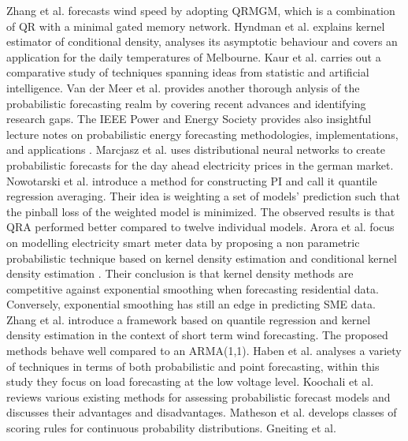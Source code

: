 Zhang et al. \cite{zhang2019wind} forecasts wind speed by adopting QRMGM, which is a combination of QR with a minimal gated memory network.
Hyndman et al. \cite{hyndman1996estimating} explains kernel estimator of conditional density, analyses its asymptotic behaviour and covers an application for the daily temperatures of Melbourne.
Kaur et al. \cite{kaur2022energy} carries out a comparative study of techniques spanning ideas from statistic and artificial intelligence.
Van der Meer et al. \cite{van2018review} provides another thorough anlysis of the probabilistic forecasting realm by covering recent advances and identifying research gaps.
The IEEE Power and Energy Society provides also insightful lecture notes on probabilistic energy forecasting methodologies,
implementations, and applications \cite{gm_22}.
Marcjasz et al. \cite{probablistic_electricity_forecast2} uses distributional neural networks to create probabilistic forecasts for the day ahead electricity prices in the german market.
Nowotarski et al. \cite{nowotarski2015computing} introduce a method for constructing PI and call it quantile regression averaging. Their idea is weighting a set of models' prediction such that the pinball loss of the weighted model is minimized. The observed results is that QRA performed better compared to twelve individual models.
Arora et al. \cite{arora2016forecasting} focus on modelling electricity smart meter data by proposing a non parametric probabilistic technique based on kernel density estimation and conditional kernel density estimation \cite{rosenblatt1969conditional} \cite{hyndman1996estimating}. Their conclusion is that kernel density methods are competitive against exponential smoothing when forecasting residential data. Conversely, exponential smoothing has still an edge in predicting SME data.
Zhang et al. \cite{zhang2020probability} introduce a framework based on quantile regression and kernel density estimation in the context of short term wind forecasting. The proposed methods behave well compared to an ARMA(1,1).
Haben et al. \cite{haben2018short} analyses a variety of techniques in terms of both probabilistic and point forecasting, within this study they focus on load forecasting at the low voltage level.
Koochali et al. \cite{koochali2022random} reviews various existing methods for assessing probabilistic forecast models and discusses their advantages and disadvantages.
Matheson et al. \cite{matheson1976scoring} develops classes of scoring rules for continuous probability distributions.
Gneiting et al. \cite{gneiting2007strictly}

